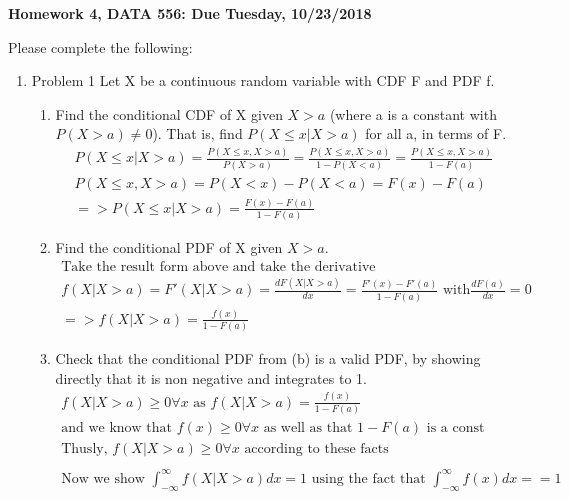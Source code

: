 \documentclass[11pt]{article}
\begin{document}
\begin{title}
	{\Large\bf Homework 4, DATA 556: Due Tuesday, 10/23/2018}
\end{title}

\author{\bf Alexander Van Roijen}

\maketitle

\newpage
Please complete the following:
\begin{enumerate}
\item Problem 1
Let X be a continuous random variable with CDF F and PDF f.
\begin{enumerate}
	\item Find the conditional CDF of X given $X > a$ (where a is a constant with $P(X>a) \ne 0$). That is, find $P(X\le x|X>a)$ for all a, in terms of F.
	\begin{gather}
	P(X \le x | X > a) = \frac{P(X \le x , X > a)}{P(X>a)} = \frac{P(X \le x , X > a)}{1-P(X<a)} = \frac{P(X \le x , X > a)}{1-F(a)} \\
	P(X \le x , X > a) = P(X<x) - P(X<a) = F(x) - F(a)\\
	=>P(X \le x | X > a) = \frac{F(x)-F(a)}{1-F(a)}
	\end{gather}
	\item Find the conditional PDF of X given $X > a$.
	\begin{gather}
		\text{Take the result form above and take the derivative }\\
		f(X|X>a) = F'(X|X>a) = \frac{dF(X|X>a)}{dx} = \frac{F'(x)-F'(a)}{1-F(a)} \text{ with} \frac{dF(a)}{dx} = 0 \\
		=> f(X|X>a) =\frac{f(x)}{1-F(a)}
	\end{gather}
	\item Check that the conditional PDF from (b) is a valid PDF, by showing directly that it is non negative and integrates to 1.
	\begin{gather}
		f(X|X>a) \ge 0 \forall x \text{ as } f(X|X>a) =\frac{f(x)}{1-F(a)} \\
		\text{and we know that } f(x) \ge 0 \forall x \text{ as well as that } 1-F(a) \text{ is a const}
		\\
		\text{Thusly, } f(X|X>a) \ge 0 \forall x \text{ according to these facts}
		\\
		\\
		\text{Now we show } \int_{-\infty}^{\infty} f(X|X>a)dx = 1 \text{ using the fact that } \int_{-\infty}^{\infty} f(x)dx =  = 1 \\

\end{gather}
\end{enumerate}
\end{enumerate}
\end{document}
